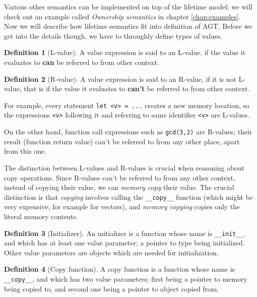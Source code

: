\documentclass[times, utf8, diplomski]{fer}
\theoremstyle{definition}
\newtheorem{definition}{Definition}[]
\begin{document}
Various other semantics can be implemented on top of the lifetime model; we will check out an example called
\textit{Ownership semantics} in chapter \ref{chap:examples}. 
Now we will describe how lifetime semantics fit into
definition of AGT. Before we get into the details though, we have to throughly define types of values.

\begin{definition}[L-value]
A value expression is said to an L-value, 
if the value it evaluates to \textbf{can} be referred to from other context.
\end{definition}

\begin{definition}[R-value]
A value expression is said to an R-value, if it is not L-value, that is
if the value it evaluates to \textbf{can't} be referred to from other context.
\end{definition}

For example, every statement \texttt{let <v> = ...} creates a new memory location,
so the expressions \texttt{<v>} following it and referring to same identifier \texttt{<v>} are L-values.

On the other hand, function call expressions such as \texttt{gcd(3,2)} are R-values; their result
(function return value) can't be referred to from any other place, apart from this one.

The distinction between L-values and R-values is crucial when reasoning about copy operations.
Since R-values can't be referred to from any other context, instead of copying their value, 
we can \textit{memory copy} their value. The crucial distinction is that \textit{copying}
involves calling the \texttt{\_\_copy\_\_} function (which might be very expensive, for example for vectors),
and \textit{memory copying} copies only the literal memory contents.

\begin{definition}[Initializer]
An initializer is a function whose name is \texttt{\_\_init\_\_}, and which has at least one value parameter;
a pointer to type being initialized. Other value parameters are objects which are needed for initialization.
\end{definition}

\begin{definition}[Copy function]
A copy function is a function whose name is \texttt{\_\_copy\_\_}, and which has two value parameters;
first being a pointer to memory being copied to, and second one being a pointer to object copied from.
\end{definition}
\end{document}
